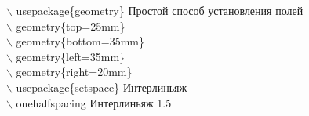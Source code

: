 \documentclass[a4paper,14pt,oneside]{book}
\theoremstyle{plain} %
\theoremstyle{definition} %
\theoremstyle{remark} %
\begin{document}
$\backslash$ usepackage\{geometry\}  \hfill {\ttfamily Простой способ установления полей}\\
    $\backslash$ geometry\{top=25mm\}\\
    $\backslash$ geometry\{bottom=35mm\}\\
    $\backslash$ geometry\{left=35mm\}\\
    $\backslash$ geometry\{right=20mm\}\\

 $\backslash$ usepackage\{setspace\} \hfill {\ttfamily Интерлиньяж}\\  
 $\backslash$ onehalfspacing \hfill {\ttfamily Интерлиньяж 1.5}\\  



 

\end{document}
